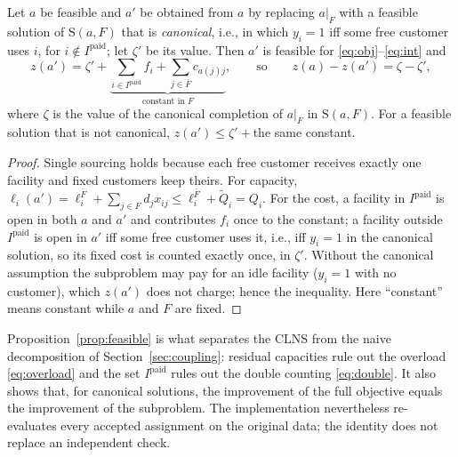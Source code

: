 \begin{proposition}[Coordination]\label{prop:feasible}
Let $a$ be feasible and $a'$ be obtained from $a$ by replacing $a|_F$ with a feasible solution of
$\mathrm{S}(a,F)$ that is \emph{canonical}, i.e., in which $y_i=1$ iff some free customer uses
$i$, for $i\notin I^{\mathrm{paid}}$; let $\zeta'$ be its value. Then $a'$ is feasible for
\eqref{eq:obj}--\eqref{eq:int} and
\begin{equation}\label{eq:delta}
z(a')=\zeta'+\underbrace{\sum_{i\in I^{\mathrm{paid}}}f_i+\sum_{j\in\bar F}c_{a(j)j}}_{\text{constant in }F},
\qquad\text{so}\qquad z(a)-z(a')=\zeta-\zeta',
\end{equation}
where $\zeta$ is the value of the canonical completion of $a|_F$ in $\mathrm{S}(a,F)$. For a
feasible solution that is not canonical, $z(a')\le\zeta'+{}$the same constant.
\end{proposition}
\begin{proof}
Single sourcing holds because each free customer receives exactly one facility and fixed
customers keep theirs. For capacity, $\ell_i(a')=\ell^{\bar F}_i+\sum_{j\in F}d_jx_{ij}\le
\ell^{\bar F}_i+\tilde Q_i=Q_i$. For the cost, a facility in $I^{\mathrm{paid}}$ is open in both
$a$ and $a'$ and contributes $f_i$ once to the constant; a facility outside
$I^{\mathrm{paid}}$ is open in $a'$ iff some free customer uses it, i.e., iff $y_i=1$ in the
canonical solution, so its fixed cost is counted exactly once, in $\zeta'$. Without the canonical
assumption the subproblem may pay for an idle facility ($y_i=1$ with no customer), which $z(a')$
does not charge; hence the inequality. Here ``constant'' means constant while $a$ and $F$ are
fixed.
\end{proof}
\noindent Proposition~\ref{prop:feasible} is what separates the CLNS from the naive
decomposition of Section~\ref{sec:coupling}: residual capacities rule out the overload
\eqref{eq:overload} and the set $I^{\mathrm{paid}}$ rules out the double counting
\eqref{eq:double}. It also shows that, for canonical solutions, the improvement of the full objective equals the
improvement of the subproblem. The implementation nevertheless re-evaluates every accepted
assignment on the original data; the identity does not replace an independent check.

